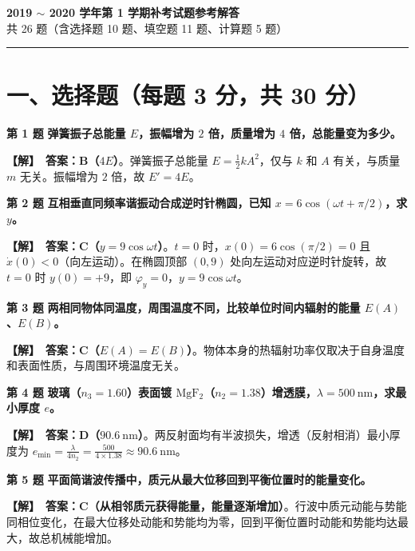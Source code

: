 \documentclass[zihao=5,a4paper,UTF8]{ctexart}
\newenvironment{prob}[2]{%
    \par\vspace{5pt}\noindent\textbf{\color{navy}#1} \textbf{#2}\par\nopagebreak\vspace{2pt}%
}{%
    \par\vspace{3pt}%
}
\newcommand{\sol}{\noindent\textbf{\color{tealaccent}【解】}\ }
\begin{document}
\begin{center}
    {\Large\bfseries\color{navy} 2019 $\sim$ 2020 学年第 1 学期补考试题参考解答}\\[4pt]
    {\small\color{gray} 共 26 题（含选择题 10 题、填空题 11 题、计算题 5 题）}
\end{center}
\vspace{2pt}\hrule\vspace{6pt}


\section*{一、选择题（每题 3 分，共 30 分）}

\begin{prob}{第 1 题}{弹簧振子总能量 $E$，振幅增为 $2$ 倍，质量增为 $4$ 倍，总能量变为多少。}
\sol \textbf{答案：B（$4E$）}。弹簧振子总能量 $E = \frac{1}{2}kA^2$，仅与 $k$ 和 $A$ 有关，与质量 $m$ 无关。振幅增为 $2$ 倍，故 $E' = 4E$。
\end{prob}

\begin{prob}{第 2 题}{互相垂直同频率谐振动合成逆时针椭圆，已知 $x = 6\cos(\omega t + \pi/2)$，求 $y$。}
\sol \textbf{答案：C（$y = 9\cos\omega t$）}。$t=0$ 时，$x(0) = 6\cos(\pi/2) = 0$ 且 $\dot{x}(0) < 0$（向左运动）。在椭圆顶部 $(0, 9)$ 处向左运动对应逆时针旋转，故 $t=0$ 时 $y(0) = +9$，即 $\varphi_y = 0$，$y = 9\cos\omega t$。
\end{prob}

\begin{prob}{第 3 题}{两相同物体同温度，周围温度不同，比较单位时间内辐射的能量 $E(A)$、$E(B)$。}
\sol \textbf{答案：C（$E(A) = E(B)$）}。物体本身的热辐射功率仅取决于自身温度和表面性质，与周围环境温度无关。
\end{prob}

\begin{prob}{第 4 题}{玻璃（$n_3=1.60$）表面镀 $\mathrm{MgF_2}$（$n_2=1.38$）增透膜，$\lambda=500\ \mathrm{nm}$，求最小厚度 $e$。}
\sol \textbf{答案：D（$90.6\ \mathrm{nm}$）}。两反射面均有半波损失，增透（反射相消）最小厚度为 $e_{\min} = \frac{\lambda}{4n_2} = \frac{500}{4\times 1.38} \approx 90.6\ \mathrm{nm}$。
\end{prob}

\begin{prob}{第 5 题}{平面简谐波传播中，质元从最大位移回到平衡位置时的能量变化。}
\sol \textbf{答案：C（从相邻质元获得能量，能量逐渐增加）}。行波中质元动能与势能同相位变化，在最大位移处动能和势能均为零，回到平衡位置时动能和势能均达最大，故总机械能增加。
\end{prob}
\end{document}
